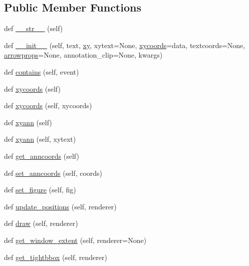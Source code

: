 \subsection*{Public Member Functions}
\begin{DoxyCompactItemize}
\item 
def \hyperlink{classmatplotlib_1_1text_1_1Annotation_a3bdeb352ff5fdd12852dcb67d77d2540}{\+\_\+\+\_\+str\+\_\+\+\_\+} (self)
\item 
def \hyperlink{classmatplotlib_1_1text_1_1Annotation_a78afac5445d3527cc24b1a986bc9125e}{\+\_\+\+\_\+init\+\_\+\+\_\+} (self, text, \hyperlink{classmatplotlib_1_1text_1_1__AnnotationBase_ac9c32848102bb1318fba1c9497534435}{xy}, xytext=None, \hyperlink{classmatplotlib_1_1text_1_1Annotation_a67166a9fae3b98b15a3c392beefb415b}{xycoords}=\textquotesingle{}data\textquotesingle{}, textcoords=None, \hyperlink{classmatplotlib_1_1text_1_1Annotation_a4f0a93979003c07b7749599b60099f34}{arrowprops}=None, annotation\+\_\+clip=None, kwargs)
\item 
def \hyperlink{classmatplotlib_1_1text_1_1Annotation_aa3eae7d28193ba24b681bc22920b96e0}{contains} (self, event)
\item 
def \hyperlink{classmatplotlib_1_1text_1_1Annotation_a67166a9fae3b98b15a3c392beefb415b}{xycoords} (self)
\item 
def \hyperlink{classmatplotlib_1_1text_1_1Annotation_aa96c62b2727a56e6220706eb3c84e6a8}{xycoords} (self, xycoords)
\item 
def \hyperlink{classmatplotlib_1_1text_1_1Annotation_aea4a880dec3ce47cb412e84fec8b4360}{xyann} (self)
\item 
def \hyperlink{classmatplotlib_1_1text_1_1Annotation_ad89401b7c75dbed58c660aec3243e740}{xyann} (self, xytext)
\item 
def \hyperlink{classmatplotlib_1_1text_1_1Annotation_a3085c0367a0399d0295b5b30bd4323b8}{get\+\_\+anncoords} (self)
\item 
def \hyperlink{classmatplotlib_1_1text_1_1Annotation_a67a447f47cb92d617950725500222248}{set\+\_\+anncoords} (self, coords)
\item 
def \hyperlink{classmatplotlib_1_1text_1_1Annotation_ab3b4e137cfee034f150cf8c0a5567f14}{set\+\_\+figure} (self, fig)
\item 
def \hyperlink{classmatplotlib_1_1text_1_1Annotation_aecf40ec66fa4c79f7c95bf29e9551e75}{update\+\_\+positions} (self, renderer)
\item 
def \hyperlink{classmatplotlib_1_1text_1_1Annotation_a0bd0072340c04407e778f1739d25541a}{draw} (self, renderer)
\item 
def \hyperlink{classmatplotlib_1_1text_1_1Annotation_a1ff1023728f3fc3f3c291d5e5fc5c897}{get\+\_\+window\+\_\+extent} (self, renderer=None)
\item 
def \hyperlink{classmatplotlib_1_1text_1_1Annotation_a60a28cba43346489f31dd10ccd63268f}{get\+\_\+tightbbox} (self, renderer)
\end{DoxyCompactItemize}

